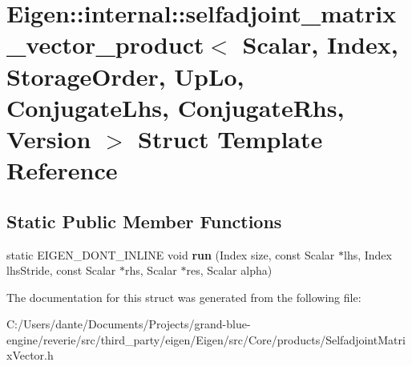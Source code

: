\hypertarget{struct_eigen_1_1internal_1_1selfadjoint__matrix__vector__product}{}\section{Eigen\+::internal\+::selfadjoint\+\_\+matrix\+\_\+vector\+\_\+product$<$ Scalar, Index, Storage\+Order, Up\+Lo, Conjugate\+Lhs, Conjugate\+Rhs, Version $>$ Struct Template Reference}
\label{struct_eigen_1_1internal_1_1selfadjoint__matrix__vector__product}
\subsection*{Static Public Member Functions}
\begin{DoxyCompactItemize}
\item 
\mbox{\label{struct_eigen_1_1internal_1_1selfadjoint__matrix__vector__product_aff9204e97b5c0a7887b0619c6305dd34}} 
static E\+I\+G\+E\+N\+\_\+\+D\+O\+N\+T\+\_\+\+I\+N\+L\+I\+NE void {\bfseries run} (Index size, const Scalar $\ast$lhs, Index lhs\+Stride, const Scalar $\ast$rhs, Scalar $\ast$res, Scalar alpha)
\end{DoxyCompactItemize}


The documentation for this struct was generated from the following file\+:\begin{DoxyCompactItemize}
\item 
C\+:/\+Users/dante/\+Documents/\+Projects/grand-\/blue-\/engine/reverie/src/third\+\_\+party/eigen/\+Eigen/src/\+Core/products/Selfadjoint\+Matrix\+Vector.\+h\end{DoxyCompactItemize}
